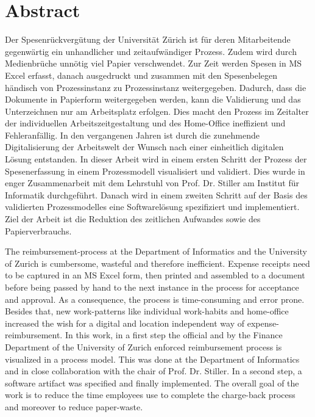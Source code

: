 \chapter*{Abstract}


Der Spesenrückvergütung der Universität Zürich ist für deren Mitarbeitende gegenwärtig ein unhandlicher und zeitaufwändiger Prozess. Zudem wird durch Medienbrüche unnötig viel Papier verschwendet. Zur Zeit werden Spesen in MS Excel erfasst, danach ausgedruckt und zusammen mit den Spesenbelegen händisch von Prozessinstanz zu Prozessinstanz weitergegeben. Dadurch, dass die Dokumente in Papierform weitergegeben werden, kann die Validierung und das Unterzeichnen nur am Arbeitsplatz erfolgen. Dies macht den Prozess im Zeitalter der individuellen Arbeitszeitgestaltung und des Home-Office ineffizient und Fehleranfällig. In den vergangenen Jahren ist durch die zunehmende Digitalisierung der Arbeitswelt der Wunsch nach einer einheitlich digitalen Lösung entstanden. In dieser Arbeit wird in einem ersten Schritt der Prozess der Spesenerfassung in einem Prozessmodell visualisiert und validiert. Dies wurde in enger Zusammenarbeit mit dem Lehrstuhl von Prof. Dr. Stiller am Institut für Informatik durchgeführt. Danach wird in einem zweiten Schritt auf der Basis des validierten Prozessmodelles eine Softwarelösung spezifiziert und implementiert. Ziel der Arbeit ist die Reduktion des zeitlichen Aufwandes sowie des Papierverbrauchs.



The reimbursement-process at the Department of Informatics and the University of Zurich is cumbersome, wasteful and therefore inefficient. Expense receipts need to be captured in an MS Excel form, then printed and assembled to a document before being passed by hand to the next instance in the process for acceptance and approval. As a consequence, the process is time-consuming and error prone. Besides that, new work-patterns like individual work-habits and home-office increased the wish for a digital and location independent way of expense-reimbursement. In this work, in a first step the official and by the Finance Department of the University of Zurich enforced reimbursement process is visualized in a process model. This was done at the Department of Informatics and in close collaboration with the chair of Prof. Dr. Stiller. In a second step, a software artifact was specified and finally implemented. The overall goal of the work is to reduce the time employees use to complete the charge-back process and moreover to reduce paper-waste.
